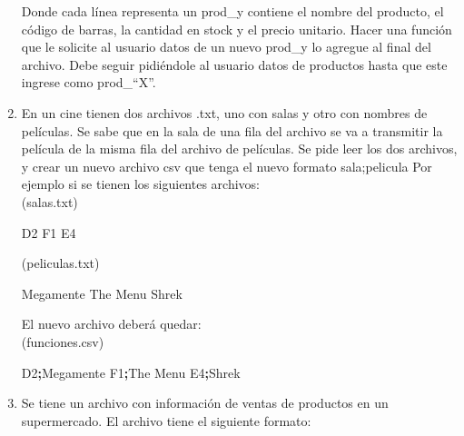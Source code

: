 \documentclass[
  letterpaper,
  DIV=11,
  numbers=noendperiod]{scrreprt}
\newenvironment{Shaded}{\begin{snugshade}}{\end{snugshade}}
\newcommand{\ExtensionTok}[1]{\textcolor[rgb]{0.00,0.23,0.31}{#1}}
\newcommand{\KeywordTok}[1]{\textcolor[rgb]{0.00,0.23,0.31}{\textbf{#1}}}
\newcommand{\NormalTok}[1]{\textcolor[rgb]{0.00,0.23,0.31}{#1}}
\begin{document}
\begin{enumerate}
  Donde cada línea representa un prod\_y contiene el nombre del
  producto, el código de barras, la cantidad en stock y el precio
  unitario. Hacer una función que le solicite al usuario datos de un
  nuevo prod\_y lo agregue al final del archivo. Debe seguir pidiéndole
  al usuario datos de productos hasta que este ingrese como prod\_``X''.
\item
  En un cine tienen dos archivos .txt, uno con salas y otro con nombres
  de películas. Se sabe que en la sala de una fila del archivo se va a
  transmitir la película de la misma fila del archivo de películas. Se
  pide leer los dos archivos, y crear un nuevo archivo csv que tenga el
  nuevo formato sala;pelicula Por ejemplo si se tienen los siguientes
  archivos:\\

  (salas.txt)

\begin{Shaded}
\begin{Highlighting}[]
\ExtensionTok{D2}
\ExtensionTok{F1}
\ExtensionTok{E4}
\end{Highlighting}
\end{Shaded}

  (peliculas.txt)

\begin{Shaded}
\begin{Highlighting}[]
\ExtensionTok{Megamente}
\ExtensionTok{The}\NormalTok{ Menu}
\ExtensionTok{Shrek}
\end{Highlighting}
\end{Shaded}

  El nuevo archivo deberá quedar:\\
  (funciones.csv)

\begin{Shaded}
\begin{Highlighting}[]
\ExtensionTok{D2}\KeywordTok{;}\ExtensionTok{Megamente}
\ExtensionTok{F1}\KeywordTok{;}\ExtensionTok{The}\NormalTok{ Menu}
\ExtensionTok{E4}\KeywordTok{;}\ExtensionTok{Shrek}
\end{Highlighting}
\end{Shaded}
\item
  Se tiene un archivo con información de ventas de productos en un
  supermercado. El archivo tiene el siguiente formato:


\end{enumerate}
\end{document}
